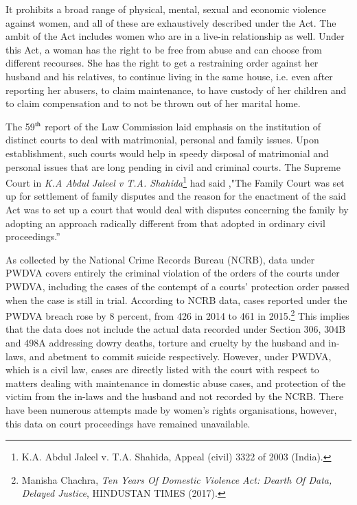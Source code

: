 \begin{multicols}{2}

\noi
It prohibits a broad range of physical, mental, sexual and economic violence against women,
and all of these are exhaustively described under the Act. The ambit of the Act includes
women who are in a live-in relationship as well. Under this Act, a woman has the right to be
free from abuse and can choose from different recourses. She has the right to get a restraining
order against her husband and his relatives, to continue living in the same house, i.e. even
after reporting her abusers, to claim maintenance, to have custody of her children and to
claim compensation and to not be thrown out of her marital home.


\noi
The 59$^{\rm th}$ report of the Law Commission laid emphasis on the institution of distinct courts to
deal with matrimonial, personal and family issues. Upon establishment, such courts would
help in speedy disposal of matrimonial and personal issues that are long pending in civil and
criminal courts. The Supreme Court in \textit{K.A Abdul Jaleel v T.A. Shahida}\footnote{K.A. Abdul Jaleel v. T.A. Shahida, Appeal (civil) 3322 of 2003 (India).} had said ,"The
Family Court was set up for settlement of family disputes and the reason for the enactment of
the said Act was to set up a court that would deal with disputes concerning the family
by adopting an approach radically different from that adopted in ordinary civil proceedings.” 


\noi
As collected by the National Crime Records Bureau (NCRB), data under PWDVA covers
entirely the criminal violation of the orders of the courts under PWDVA, including the cases
of the contempt of a courts’ protection order passed when the case is still in trial. According
to NCRB data, cases reported under the PWDVA breach rose by 8 percent, from 426 in 2014
to 461 in 2015.\footnote{Manisha Chachra, \textit{Ten Years Of Domestic Violence Act: Dearth Of Data, Delayed Justice}, HINDUSTAN
TIMES (2017).} This implies that the data does not include the actual data recorded under
Section 306, 304B and 498A addressing dowry deaths, torture and cruelty by the husband and
in-laws, and abetment to commit suicide respectively. However, under PWDVA, which is a
civil law, cases are directly listed with the court with respect to matters dealing with
maintenance in domestic abuse cases, and protection of the victim from the in-laws and the
husband and not recorded by the NCRB. There have been numerous attempts made by
women's rights organisations, however, this data on court proceedings have remained
unavailable. 


\end{multicols}
